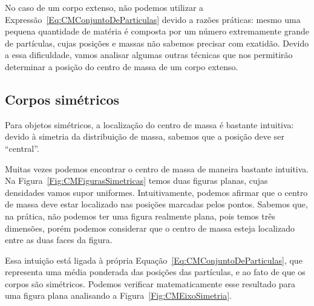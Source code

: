 No caso de um corpo extenso, não podemos utilizar a Expressão~\eqref{Eq:CMConjuntoDeParticulas} devido a razões práticas: mesmo uma pequena quantidade de matéria é composta por um número extremamente grande de partículas, cujas posições e massas não sabemos precisar com exatidão. Devido a essa dificuldade, vamos analisar algumas outras técnicas que nos permitirão determinar a posição do centro de massa de um corpo extenso.

\subsection{Corpos simétricos}

\begin{marginfigure}
\centering
{}
\caption{Para objetos simétricos, a localização do centro de massa é bastante intuitiva: devido à simetria da distribuição de massa, sabemos que a posição deve ser ``central''. \label{Fig:CMFigurasSimetricas}}
\end{marginfigure}

Muitas vezes podemos encontrar o centro de massa de maneira bastante intuitiva. Na Figura~\ref{Fig:CMFigurasSimetricas} temos duas figuras planas, cujas densidades vamos supor uniformes. Intuitivamente, podemos afirmar que o centro de massa deve estar localizado nas posições marcadas pelos pontos. Sabemos que, na prática, não podemos ter uma figura realmente plana, pois temos três dimensões, porém podemos considerar que o centro de massa esteja localizado entre as duas faces da figura.

Essa intuição está ligada à própria Equação~\eqref{Eq:CMConjuntoDeParticulas}, que representa uma média ponderada das posições das partículas, e ao fato de que os corpos são simétricos. Podemos verificar matematicamente esse resultado para uma figura plana analisando a Figura~\ref{Fig:CMEixoSimetria}.

